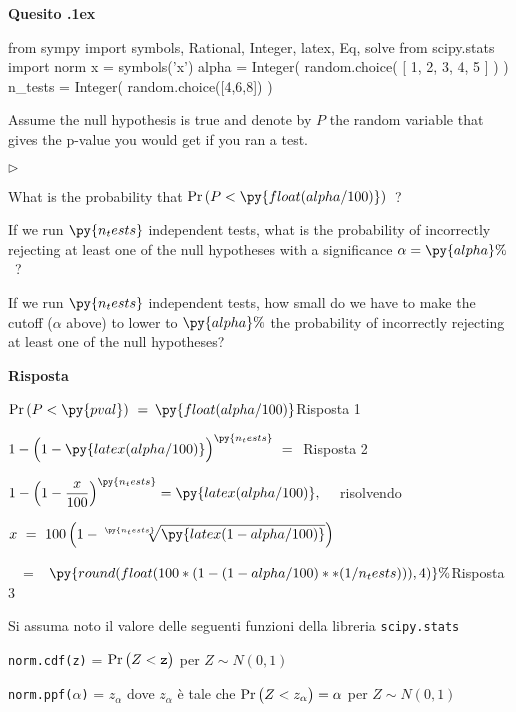 \documentclass[11pt,twoside,a4paper]{article}
\newcommand{\mylabel}[1]{#1\hfill}
\renewenvironment{itemize}
  {\begin{list}{$\triangleright$}{%
   \setlength{\parskip}{0mm}
   \setlength{\topsep}{.4\baselineskip}
   \setlength{\rightmargin}{0mm}
   \setlength{\listparindent}{0mm}
   \setlength{\itemindent}{0mm}
   \setlength{\labelwidth}{2ex}
   \setlength{\itemsep}{.4\baselineskip}
   \setlength{\parsep}{0mm}
   \setlength{\partopsep}{0mm}
   \setlength{\labelsep}{1ex}
   \setlength{\leftmargin}{\labelwidth+\labelsep}
   \let\makelabel\mylabel}}{%
   \end{list}\vspace*{-1.3mm}}
\def\Pr{{\rm Pr\,}}
\newcounter{quesito}
\newenvironment{question}{\bigskip\addtocounter{quesito}{1}\par\textbf{Quesito \thequesito.\kern1ex}}{\vspace{\parskip}}
\newenvironment{answer}{\par\textbf{Risposta\quad}}{\vspace{\parskip}}
\begin{document}
\clearpage
\begin{question} %
\begin{pycode}
from sympy import symbols, Rational, Integer, latex, Eq, solve
from scipy.stats import norm
x = symbols('x')
alpha = Integer( random.choice( [ 1, 2, 3, 4, 5 ] ) )
n_tests = Integer( random.choice([4,6,8]) )
\end{pycode}
Assume the null hypothesis is true and denote by $P$ the random variable that gives the p-value you would get if you ran a test.

\begin{itemize}
\item[1.] What is the probability that $\Pr(P<\py{float(alpha/100) })$~?

\item[2.] If we run $\py{n_tests}$ independent tests, what is the probability of incorrectly rejecting at least one of the null hypotheses with a significance $\alpha=\py{alpha}\%$~?

\item[3.] If we run $\py{n_tests}$ independent tests, how small do we have to make the cutoff ($\alpha$ above) to lower to $\py{alpha}\%$ the probability of incorrectly rejecting at least one of the null hypotheses? 
\end{itemize}

\begin{answer}

$\Pr(P<\py{pval})\ =\ ${\color{blue}$\py{float(alpha/100) }$\hfill Risposta 1}


$\displaystyle 1-\Big(1-\py{latex(alpha/100) }\Big)^{\py{n_tests}}\ =\  ${\color{blue} \hfill Risposta 2}

$\displaystyle 1-\Big(1-\frac{x}{100}\Big)^{\py{n_tests}}=\py{latex(alpha/100) }, \quad$ 
risolvendo 

$\displaystyle x\ =\ 100\,\Big( 1-\sqrt[\py{n_tests}]{\py{latex(1-alpha/100) } }\Big)$\medskip

$\displaystyle\phantom{x}\ =$ {\color{blue}$\kern1ex\py{round(float( 100*( 1- (1-alpha/100)**(1/n_tests) ) ), 4) }\%$\hfill Risposta 3}




\end{answer}
\end{question}











\vfill
\hrulefill

Si assuma noto il valore delle seguenti funzioni della libreria {\tt scipy.stats\/}

{\tt norm.cdf(z)} = $\Pr\big(Z<{\tt z}\big)$ per $Z\sim N(0,1)$ 

{\tt norm.ppf($\alpha$)} = $z_\alpha$ dove $z_\alpha$ è tale che $\Pr\big(Z<z_\alpha\big)=\alpha$ per $Z\sim N(0,1)$ 
\end{document}
